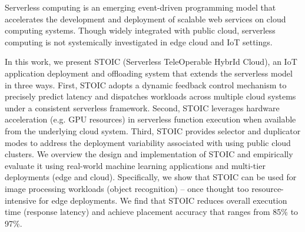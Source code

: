 Serverless computing is an emerging event-driven programming model that accelerates the development and deployment of scalable web services on cloud computing systems. Though widely integrated with public cloud, serverless computing is not systemically investigated in edge cloud and IoT settings. 

In this work, we present STOIC (Serverless TeleOperable HybrId Cloud), an IoT application deployment and offloading system that extends the serverless model in three ways. First, STOIC adopts a dynamic feedback control mechanism to precisely predict latency and dispatches workloads across multiple cloud systems under a consistent serverless framework. Second, STOIC leverages hardware acceleration (e.g. GPU resources) in serverless function execution when available from the underlying cloud system. Third, STOIC provides selector and duplicator modes to address the deployment variability associated with using public cloud clusters. We overview the design and implementation of STOIC and empirically evaluate it using real-world machine learning applications and multi-tier deployments (edge and cloud). Specifically, we show that STOIC can be used for image processing workloads (object recognition) -- once thought too resource-intensive for edge deployments. We find that STOIC reduces overall execution time (response latency) and achieve placement accuracy that ranges from 85\% to 97\%.